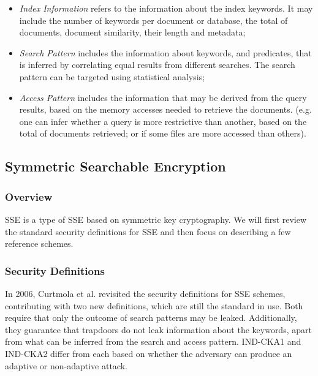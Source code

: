 \begin{itemize}
    \item \emph{Index Information} refers to the information about the index keywords. It may include the number of keywords per document or database, the total of documents, document similarity, their length and metadata;
    \item \emph{Search Pattern} includes the information about keywords, and predicates, that is inferred by correlating equal results from different searches. The search pattern can be targeted using statistical analysis;
    \item \emph{Access Pattern} includes the information that may be derived from the query results, based on the memory accesses needed to retrieve the documents. (e.g. one can infer whether a query is more restrictive than another, based on the total of documents retrieved; or if some files are more accessed than others). 
\end{itemize}

\subsection{Symmetric Searchable Encryption}
\label{ch2:sec:symmetric-searchable-encryption}

\subsubsection{Overview}

\gls{SSE} is a type of \gls{SSE} based on symmetric key cryptography. We will first review the standard security definitions for \gls{SSE} and then focus on describing a few reference schemes.

\subsubsection{Security Definitions}

In 2006, Curtmola et al. \autocite{Curtmola2011-hi} revisited the security definitions for \gls{SSE} schemes, contributing with two new definitions, which are still the standard in use. Both require that only the outcome of search patterns may be leaked. Additionally, they guarantee that trapdoors do not leak information about the keywords, apart from what can be inferred from the search and access pattern. \gls{IND-CKA1} and \gls{IND-CKA2} differ from each based on whether the adversary can produce an adaptive or non-adaptive attack.


